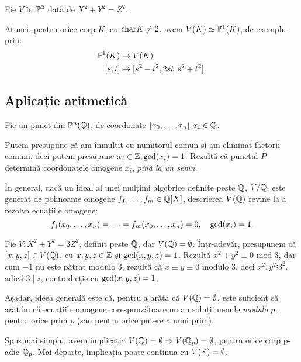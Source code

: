 \begin{example}\label{exm:var-proj}
  Fie $ V $ în $ \mathbb{P}^2 $ dată de $ X^2 + Y^2 = Z^2 $.

  Atunci, pentru orice corp $ K $, cu $ \mathrm{char}K \neq 2 $, avem $ V(K) \simeq \mathbb{P}^1(K) $,
  de exemplu prin:
  \begin{align*}
    \mathbb{P}^1(K) &\to V(K) \\
    [s, t] &\mapsto [s^2 - t^2, 2st, s^2 + t^2].
  \end{align*}
\end{example}

\subsection{Aplicație aritmetică}

Fie un punct din $ \mathbb{P}^n(\mathbb{Q}) $, de coordonate $ [x_0, \dots, x_n], x_i \in \mathbb{Q} $.

Putem presupune că am înmulțit cu numitorul comun și am eliminat factorii comuni,
deci putem presupune $ x_i \in \mathbb{Z}, \mathrm{gcd}(x_i) = 1 $. Rezultă că punctul
$ P $ determină coordonatele omogene $ x_i $, \emph{pînă la un semn}.

În general, dacă un ideal al unei mulțimi algebrice definite peste $ \mathbb{Q} $,
$ V / \mathbb{Q} $, este generat de polinoame omogene $ f_1, \dots, f_m \in \mathbb{Q}[X] $,
descrierea $ V(\mathbb{Q}) $ revine la a rezolva ecuațiile omogene:
\[
  f_1(x_0, \dots, x_n) = \dots = f_m(x_0, \dots, x_n) = 0, \quad \mathrm{gcd}(x_i) = 1.
\]

\begin{example}\label{exm:proj-aritm}
  Fie $ V : X^2 + Y^2 = 3Z^2 $, definit peste $ \mathbb{Q} $, dar $ V(\mathbb{Q}) = \emptyset $.
  Într-adevăr, presupunem că $ [x, y, z] \in V(\mathbb{Q}) $, cu $ x, y, z \in \mathbb{Z} $ și
  $ \mathrm{gcd}(x, y, z) = 1 $. Rezultă $ x^2 + y^2 \equiv 0 \text{ mod } 3 $,
  dar cum $ -1 $ nu este pătrat modulo 3, rezultă că $ x \equiv y \equiv 0 $
  modulo 3, deci $ x^2, y^2 \vdots 3^2 $, adică $ 3 \mid z $, contradicție
  cu $ \mathrm{gcd}(x, y, z) = 1 $.
\end{example}

Așadar, ideea generală este că, pentru a arăta că $ V(\mathbb{Q}) = \emptyset $, este
suficient să arătăm că ecuațiile omogene corespunzătoare nu au soluții nenule
\emph{modulo $ p $}, pentru orice prim $ p $ (sau pentru orice putere a unui prim).

Spus mai simplu, avem implicația $ V(\mathbb{Q}) = \emptyset \Rightarrow V(\mathbb{Q}_p) = \emptyset $,
pentru orice corp p-adic $ \mathbb{Q}_p $. Mai departe, implicația poate continua cu $ V(\mathbb{R}) = \emptyset $.


